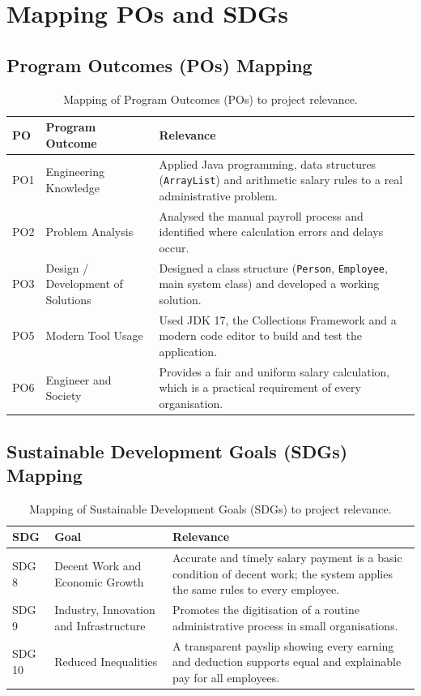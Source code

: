\documentclass[11pt,a4paper]{article}
\begin{document}
\section{Mapping POs and SDGs}

\subsection{Program Outcomes (POs) Mapping}

\begin{table}[h]
\centering
\caption{Mapping of Program Outcomes (POs) to project relevance.}
\begin{tabular}{p{}p{}p{}}
\toprule
\textbf{PO} & \textbf{Program Outcome} & \textbf{Relevance} \\
\midrule
PO1 & Engineering Knowledge & Applied Java programming, data structures (\texttt{ArrayList}) and arithmetic salary rules to a real administrative problem. \\
PO2 & Problem Analysis & Analysed the manual payroll process and identified where calculation errors and delays occur. \\
PO3 & Design / Development of Solutions & Designed a class structure (\texttt{Person}, \texttt{Employee}, main system class) and developed a working solution. \\
PO5 & Modern Tool Usage & Used JDK 17, the Collections Framework and a modern code editor to build and test the application. \\
PO6 & Engineer and Society & Provides a fair and uniform salary calculation, which is a practical requirement of every organisation. \\
\bottomrule
\end{tabular}
\end{table}

\subsection{Sustainable Development Goals (SDGs) Mapping}

\begin{table}[h]
\centering
\caption{Mapping of Sustainable Development Goals (SDGs) to project relevance.}
\begin{tabular}{p{}p{}p{}}
\toprule
\textbf{SDG} & \textbf{Goal} & \textbf{Relevance} \\
\midrule
SDG 8 & Decent Work and Economic Growth & Accurate and timely salary payment is a basic condition of decent work; the system applies the same rules to every employee. \\
SDG 9 & Industry, Innovation and Infrastructure & Promotes the digitisation of a routine administrative process in small organisations. \\
SDG 10 & Reduced Inequalities & A transparent payslip showing every earning and deduction supports equal and explainable pay for all employees. \\
\bottomrule
\end{tabular}
\end{table}
\end{document}
